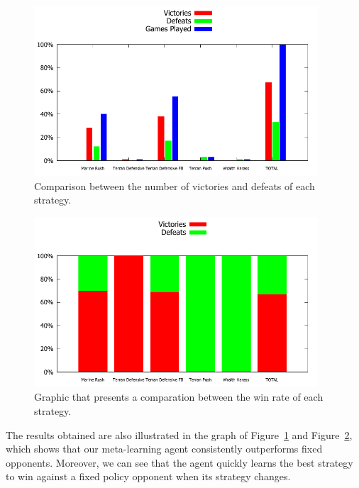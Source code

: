 \begin{figure}[ht]
\centering
\includegraphics[width=400px]{images/wins_graphic}
\caption{Comparison between the number of victories and defeats of each strategy.}
\label{fig:wins_graphic}
\end{figure}

\begin{figure}[ht]
\centering
\includegraphics[width=400px]{images/win-rates_graphic}
\caption{Graphic that presents a comparation between the win rate of each strategy.}
\label{fig:win-rates_graphic}
\end{figure}

The results obtained are also illustrated in the graph of Figure~\ref{fig:wins_graphic} and Figure~\ref{fig:win-rates_graphic}, which shows that our meta-learning agent consistently outperforms fixed opponents. 
Moreover, we can see that the agent quickly learns the best strategy to win against a fixed policy opponent when its strategy changes. 